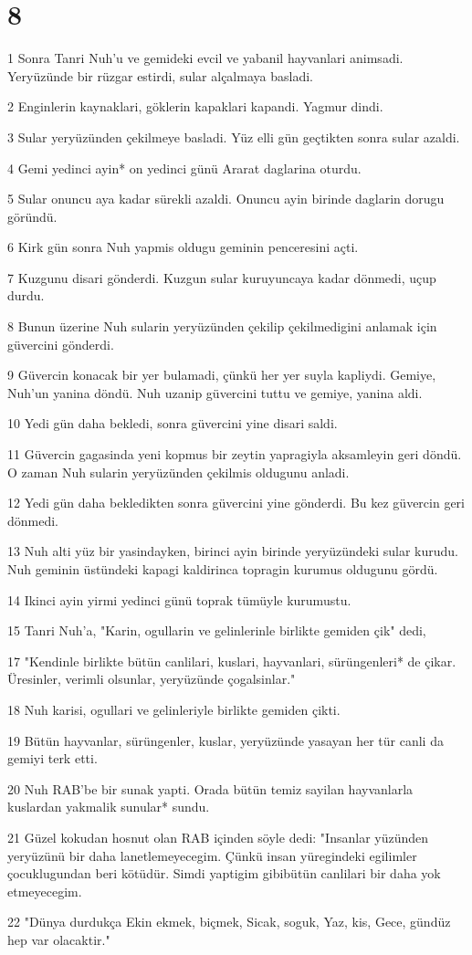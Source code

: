 \chapter{8}

\par 1 Sonra Tanri Nuh'u ve gemideki evcil ve yabanil hayvanlari animsadi. Yeryüzünde bir rüzgar estirdi, sular alçalmaya basladi.
\par 2 Enginlerin kaynaklari, göklerin kapaklari kapandi. Yagmur dindi.
\par 3 Sular yeryüzünden çekilmeye basladi. Yüz elli gün geçtikten sonra sular azaldi.
\par 4 Gemi yedinci ayin* on yedinci günü Ararat daglarina oturdu.
\par 5 Sular onuncu aya kadar sürekli azaldi. Onuncu ayin birinde daglarin dorugu göründü.
\par 6 Kirk gün sonra Nuh yapmis oldugu geminin penceresini açti.
\par 7 Kuzgunu disari gönderdi. Kuzgun sular kuruyuncaya kadar dönmedi, uçup durdu.
\par 8 Bunun üzerine Nuh sularin yeryüzünden çekilip çekilmedigini anlamak için güvercini gönderdi.
\par 9 Güvercin konacak bir yer bulamadi, çünkü her yer suyla kapliydi. Gemiye, Nuh'un yanina döndü. Nuh uzanip güvercini tuttu ve gemiye, yanina aldi.
\par 10 Yedi gün daha bekledi, sonra güvercini yine disari saldi.
\par 11 Güvercin gagasinda yeni kopmus bir zeytin yapragiyla aksamleyin geri döndü. O zaman Nuh sularin yeryüzünden çekilmis oldugunu anladi.
\par 12 Yedi gün daha bekledikten sonra güvercini yine gönderdi. Bu kez güvercin geri dönmedi.
\par 13 Nuh alti yüz bir yasindayken, birinci ayin birinde yeryüzündeki sular kurudu. Nuh geminin üstündeki kapagi kaldirinca topragin kurumus oldugunu gördü.
\par 14 Ikinci ayin yirmi yedinci günü toprak tümüyle kurumustu.
\par 15 Tanri Nuh'a, "Karin, ogullarin ve gelinlerinle birlikte gemiden çik" dedi,
\par 17 "Kendinle birlikte bütün canlilari, kuslari, hayvanlari, sürüngenleri* de çikar. Üresinler, verimli olsunlar, yeryüzünde çogalsinlar."
\par 18 Nuh karisi, ogullari ve gelinleriyle birlikte gemiden çikti.
\par 19 Bütün hayvanlar, sürüngenler, kuslar, yeryüzünde yasayan her tür canli da gemiyi terk etti.
\par 20 Nuh RAB'be bir sunak yapti. Orada bütün temiz sayilan hayvanlarla kuslardan yakmalik sunular* sundu.
\par 21 Güzel kokudan hosnut olan RAB içinden söyle dedi: "Insanlar yüzünden yeryüzünü bir daha lanetlemeyecegim. Çünkü insan yüregindeki egilimler çocuklugundan beri kötüdür. Simdi yaptigim gibibütün canlilari bir daha yok etmeyecegim.
\par 22 "Dünya durdukça Ekin ekmek, biçmek, Sicak, soguk, Yaz, kis, Gece, gündüz hep var olacaktir."

